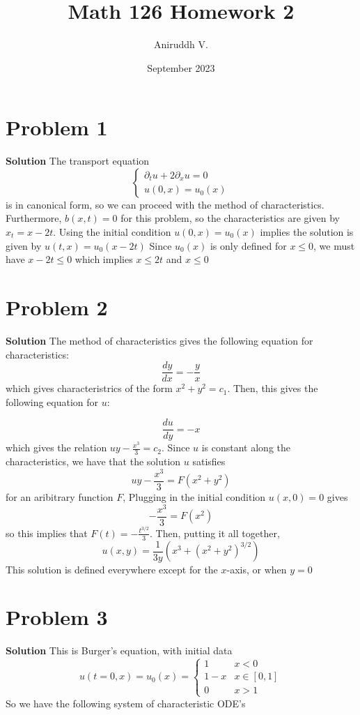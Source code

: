 \documentclass{article}
\title{Math 126 Homework 2}
\author{Aniruddh V.}
\date{September 2023}
\newcommand{\D}{\partial}
\begin{document}
\maketitle

\section{Problem 1}
\textbf{Solution } The transport equation 
\[ \begin{cases}
    \D _t u + 2 \D _x u = 0 \\
    u(0, x) = u_0(x)
\end{cases}\]
is in canonical form, so we can proceed with the method of characteristics. Furthermore, $b(x,t) = 0$ for this problem, so the characteristics are given by $x_t = x - 2t$. Using the 
initial condition $u(0, x) = u_0(x)$ implies the solution is given by $u(t, x) = u_0(x-2t)$ Since $u_0(x)$ is only defined for $x \leq 0$, we must have $x - 2t \leq 0$ which implies $x \leq 2t$
and $x \leq 0$
\section{Problem 2}
\textbf{Solution } The method of characteristics gives the following equation for characteristics:
\[\frac{dy}{dx} = -\frac{y}{x}\] which gives characteristrics of the form $x^2 + y^2 = c_1$. Then, this gives the following equation for $u$:

\[ \frac{du}{dy} = -x \] which gives the relation $uy - \frac{x^3}{3} = c_2$. Since $u$ is constant along the characteristics, we have that the solution $u$ satisfies 
\[ uy - \frac{x^3}{3} = F(x^2 + y^2) \] for an aribitrary function $F$, Plugging in the initial condition $u(x, 0) = 0$ gives 
\[ -\frac{x^3}{3} = F(x^2) \] so this implies that $F(t) = -\frac{t^{3/2}}{3}$. Then, putting it all together,
\[u(x, y) = \frac{1}{3y} \left( x^3 + (x^2 + y^2)^{3/2 }  \right) \] This solution is defined everywhere except for the $x$-axis, or when $y = 0$

\section{Problem 3}
\textbf{Solution} This is Burger's equation, with initial data 
\[ u(t=0, x) = u_0(x) = \begin{cases}
    1 & x < 0 \\
    1-x & x \in [0,1 ] \\
    0 & x > 1

\end{cases}
    \] So we have the following system of characteristic ODE's
\end{document}
